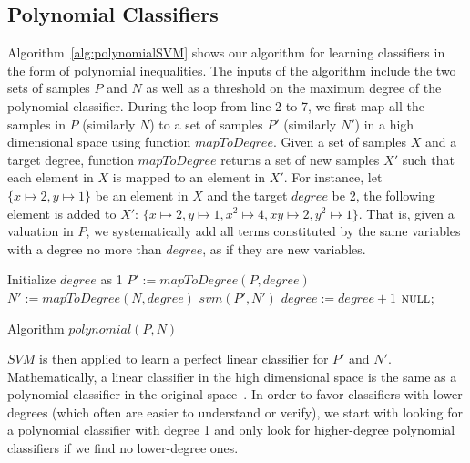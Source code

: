 \subsection{Polynomial Classifiers} Algorithm~\ref{alg:polynomialSVM} shows our algorithm for learning classifiers in the form of polynomial inequalities.
The inputs of the algorithm include the two sets of samples $P$ and $N$ as well as a threshold on the maximum degree of the polynomial classifier.
During the loop from line 2 to 7, we first map all the samples in $P$ (similarly $N$) to a set of samples $P'$ (similarly $N'$) in a high dimensional space using function $\mathit{mapToDegree}$.
Given a set of samples $X$ and a target degree, function $\mathit{mapToDegree}$ returns a set of new samples $X'$ such that each element in $X$ is mapped to an element in $X'$.
For instance, let $\{x \mapsto 2, y \mapsto 1\}$ be an element in $X$ and the target $\mathit{degree}$ be 2, 
the following element is added to $X'$: $\{x \mapsto 2, y \mapsto 1, x^2 \mapsto 4, xy \mapsto 2, y^2 \mapsto 1\}$.
That is, given a valuation in $P$, we systematically add all terms constituted by the same variables with a degree no more than $\mathit{degree}$, 
as if they are new variables.
\vspace{-0.2cm}
\begin{algorithm}[]
\SetAlgoVlined
\Indm
\Indp
    Initialize $degree$ as 1\;
     {
        $P' := \mathit{mapToDegree}(P, \mathit{degree})$\;
        $N' := \mathit{mapToDegree}(N, \mathit{degree})$\;
         {
            \Return $\mathit{svm}(P', N')$\;
        }
        $\mathit{degree} := \mathit{degree} + 1$\;
    }
    \Return $\textsc{null}$;
\caption{Algorithm $\mathit{polynomial}(P,N)$}
\label{alg:polynomialSVM}
\end{algorithm}
\vspace{-0.2cm}
$\mathit{SVM}$ is then applied to learn a perfect linear classifier for $P'$ and $N'$. %
Mathematically, a linear classifier in the high dimensional space is the same as a polynomial classifier in the original space~\cite{svm:kernel}.
In order to favor classifiers with lower degrees (which often are easier to understand or verify), 
we start with looking for a polynomial classifier with degree 1 and only look for higher-degree polynomial classifiers if we find no lower-degree ones.
